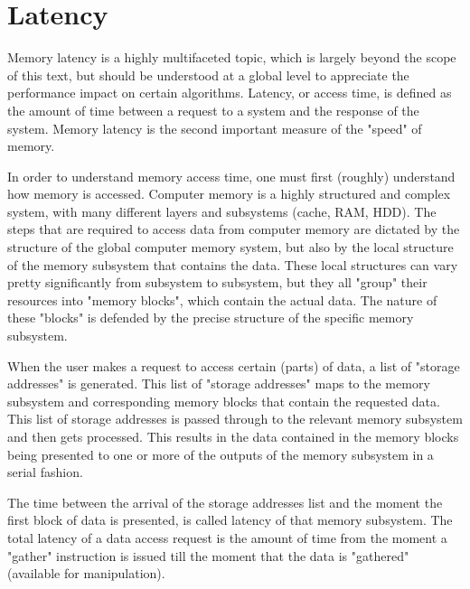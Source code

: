 \section{Latency}

\hspace{4mm}Memory latency is a highly multifaceted topic, which is largely beyond the scope of this text, but should be understood at a global level to appreciate the performance impact on certain algorithms. Latency, or access time, is defined as the amount of time between a request to a system and the response of the system.\autocite[]{wiki_latency} Memory latency is the second important measure of the "speed" of memory.\vspace{5mm}

In order to understand memory access time, one must first (roughly) understand how memory is accessed. Computer memory is a highly structured and complex system, with many different layers and subsystems (cache, RAM, HDD). The steps that are required to access data from computer memory are dictated by the structure of the global computer memory system, but also by the local structure of the memory subsystem that contains the data. These local structures can vary pretty significantly from subsystem to subsystem, but they all "group" their resources into "memory blocks", which contain the actual data. The nature of these "blocks" is defended by the precise structure of the specific memory subsystem.\vspace{5mm}

When the user makes a request to access certain (parts) of data, a list of "storage addresses" is generated. This list of "storage addresses" maps to the memory subsystem and corresponding memory blocks that contain the requested data. This list of storage addresses is passed through to the relevant memory subsystem and then gets processed. This results in the data contained in the memory blocks being presented to one or more of the outputs of the memory subsystem in a serial fashion.\vspace{5mm}

\newpage

The time between the arrival of the storage addresses list and the moment the first block of data is presented, is called latency of that memory subsystem. The total latency of a data access request is the amount of time from the moment a "gather" instruction is issued till the moment that the data is "gathered" (available for manipulation).\vspace{5mm}


